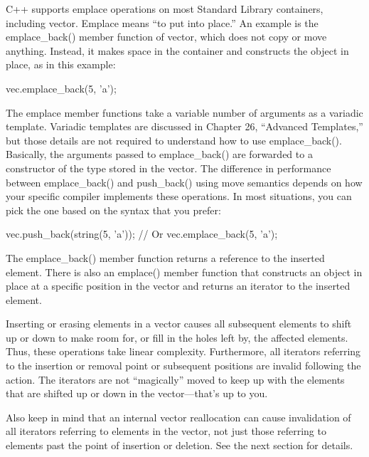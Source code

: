 
C++ supports emplace operations on most Standard Library containers, including vector. Emplace means “to put into place.” An example is the emplace\_back() member function of vector, which does not copy or move anything. Instead, it makes space in the container and constructs the object in place, as in this example:

\begin{cpp}
vec.emplace_back(5, 'a');
\end{cpp}

The emplace member functions take a variable number of arguments as a variadic template. Variadic templates are discussed in Chapter 26, “Advanced Templates,” but those details are not required to understand how to use emplace\_back(). Basically, the arguments passed to emplace\_back() are forwarded to a constructor of the type stored in the vector. The difference in performance between emplace\_back() and push\_back() using move semantics depends on how your specific compiler implements these operations. In most situations, you can pick the one based on the syntax that you prefer:

\begin{cpp}
vec.push_back(string(5, 'a'));
// Or
vec.emplace_back(5, 'a');
\end{cpp}

The emplace\_back() member function returns a reference to the inserted element. There is also an emplace() member function that constructs an object in place at a specific position in the vector and returns an iterator to the inserted element.


Inserting or erasing elements in a vector causes all subsequent elements to shift up or down to make room for, or fill in the holes left by, the affected elements. Thus, these operations take linear complexity. Furthermore, all iterators referring to the insertion or removal point or subsequent positions are invalid following the action. The iterators are not “magically” moved to keep up with the elements that are shifted up or down in the vector—that’s up to you.

Also keep in mind that an internal vector reallocation can cause invalidation of all iterators referring to elements in the vector, not just those referring to elements past the point of insertion or deletion. See the next section for details.

